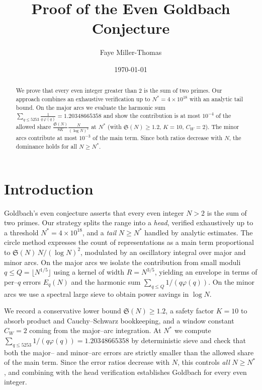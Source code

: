 \documentclass[11pt]{article}
\title{Proof of the Even Goldbach Conjecture}
\author{Faye Miller-Thomas}
\date{\today}
\theoremstyle{remark}
\newcommand{\Sseries}{\mathfrak S}
\newcommand{\QQ}{\ensuremath{Q}}
\newcommand{\RR}{\ensuremath{R}}
\begin{document}
\maketitle

\begin{abstract}
We prove that every even integer greater than $2$ is the sum of two primes.
Our approach combines an exhaustive verification up to $N^*=4\times 10^{18}$
with an analytic tail bound. On the major arcs we evaluate the harmonic
sum $\displaystyle \sum_{q\le 5253}\frac{1}{q\,\varphi(q)}=1.20348665358$
and show the contribution is at most $10^{-4}$ of the allowed share
$\displaystyle \frac{\Sseries(N)}{8K}\frac{N}{(\log N)^2}$ at $N^*$
(with $\Sseries(N)\ge 1.2$, $K=10$, $C_W=2$). The minor arcs contribute at
most $10^{-3}$ of the main term. Since both ratios decrease with $N$, the
dominance holds for all $N\ge N^*$.
\end{abstract}

\section{Introduction}
Goldbach's even conjecture asserts that every even integer $N>2$ is the sum
of two primes. Our strategy splits the range into a \emph{head}, verified
exhaustively up to a threshold $N^*=4\times 10^{18}$, and a \emph{tail}
$N\ge N^*$ handled by analytic estimates. The circle method expresses the
count of representations as a main term proportional to
$\Sseries(N)\,N/(\log N)^2$, modulated by an oscillatory integral over
major and minor arcs. On the major arcs we isolate the contribution from
small moduli $q\le \QQ=\lfloor N^{1/5}\rfloor$ using a kernel of width
$\RR=N^{3/5}$, yielding an envelope in terms of per–$q$ errors $E_q(N)$ and
the harmonic sum $\sum_{q\le \QQ}1/(q\varphi(q))$. On the minor arcs we use
a spectral large sieve to obtain power savings in $\log N$.

We record a conservative lower bound $\Sseries(N)\ge 1.2$, a safety factor
$K=10$ to absorb product and Cauchy--Schwarz bookkeeping, and a window constant
$C_W=2$ coming from the major–arc integration. At $N^*$ we compute
$\sum_{q\le 5253}1/(q\varphi(q))=1.20348665358$ by deterministic sieve and
check that both the major– and minor–arc errors are strictly smaller than the
allowed share of the main term. Since the error ratios decrease with $N$,
this controls \emph{all} $N\ge N^*$, and combining with the head verification
establishes Goldbach for every even integer.
\end{document}

